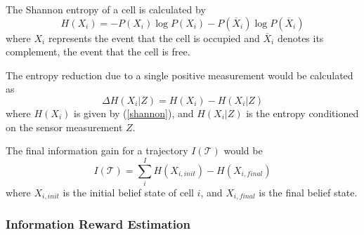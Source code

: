 



The Shannon entropy of a cell is calculated by 
\begin{equation}
    H(X_i) = -P(X_i)\log P(X_i)-P(\overline{X}_i) \log P(\overline{X}_i)
    \label{shannon}
\end{equation}
where $X_i$ represents the event that the cell is occupied and $\overline{X}_i$ denotes its complement, the event that the cell is free.

The entropy reduction due to a single positive measurement would be calculated as
\begin{equation*} %
\Delta H(X_i|Z) = H(X_i) - H(X_i|Z)
\end{equation*}
where $H(X_i)$ is given by (\ref{shannon}), and $H(X_i|Z)$ is the entropy conditioned on the sensor measurement $Z$. 

The final information gain for a trajectory $I(\mathcal{T})$ would be
\begin{equation*}
    I(\mathcal{T}) = \sum_i^I H(X_{i,init}) - H(X_{i,final})
\end{equation*}
where $X_{i,init}$ is the initial belief state of cell $i$, and $X_{i,final}$ is the final belief state.  



\subsubsection{Information Reward Estimation}\label{info-reward}

